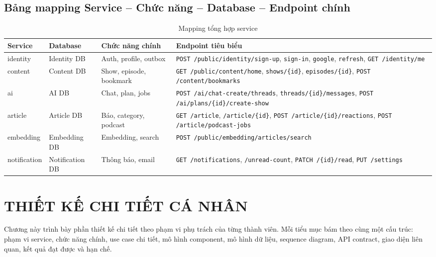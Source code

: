 \documentclass[14pt,a4paper,oneside]{extreport}
\begin{document}
\section{Bảng mapping Service -- Chức năng -- Database -- Endpoint chính}
\label{sec:mapping}

\begin{table}[H]
\centering
\caption{Mapping tổng hợp service}
\label{tab:mapping}
\renewcommand{\arraystretch}{1.3}
\scriptsize
\begin{tabularx}{\textwidth}{|l|l|l|X|}
\hline
\textbf{Service} & \textbf{Database} & \textbf{Chức năng chính} & \textbf{Endpoint tiêu biểu} \\
\hline
identity & Identity DB &
  Auth, profile, outbox &
  \texttt{POST /public/identity/sign-up}, \texttt{sign-in}, \texttt{google}, \texttt{refresh}, \texttt{GET /identity/me} \\
\hline
content & Content DB &
  Show, episode, bookmark &
  \texttt{GET /public/content/home}, \texttt{shows/\{id\}}, \texttt{episodes/\{id\}}, \texttt{POST /content/bookmarks} \\
\hline
ai & AI DB &
  Chat, plan, jobs &
  \texttt{POST /ai/chat-create/threads}, \texttt{threads/\{id\}/messages}, \texttt{POST /ai/plans/\{id\}/create-show} \\
\hline
article & Article DB &
  Báo, category, podcast &
  \texttt{GET /article}, \texttt{/article/\{id\}}, \texttt{POST /article/\{id\}/reactions}, \texttt{POST /article/podcast-jobs} \\
\hline
embedding & Embedding DB &
  Embedding, search &
  \texttt{POST /public/embedding/articles/search} \\
\hline
notification & Notification DB &
  Thông báo, email &
  \texttt{GET /notifications}, \texttt{/unread-count}, \texttt{PATCH /\{id\}/read}, \texttt{PUT /settings} \\
\hline
\end{tabularx}
\end{table}

\clearpage

\chapter{THIẾT KẾ CHI TIẾT CÁ NHÂN}
\label{chap:thiet-ke-chi-tiet}

Chương này trình bày phần thiết kế chi tiết theo phạm vi phụ trách của từng thành viên. Mỗi tiểu mục bám theo cùng một cấu trúc: phạm vi service, chức năng chính, use case chi tiết, mô hình component, mô hình dữ liệu, sequence diagram, API contract, giao diện liên quan, kết quả đạt được và hạn chế.
\end{document}
